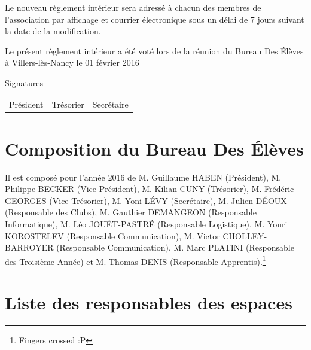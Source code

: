 \documentclass{article} %
\begin{document}
		Le nouveau règlement intérieur sera adressé à chacun des membres de
		l'association par affichage et courrier électronique sous un délai de 7
		jours suivant la date de la modification.


	\begin{center}
		{\large\light Le présent règlement intérieur a été voté lors de la réunion
		du Bureau Des Élèves à Villers-lès-Nancy le 01 février 2016}
	\end{center}
	Signatures\par
	\vspace{0.5cm}
	\begin{tabular*}{\textwidth}{@{\extracolsep{\fill}}ccc}
		Président & Trésorier & Secrétaire
	\end{tabular*}
	\vspace{3cm}
	\clearpage

	\section*{Composition du Bureau Des Élèves}
		
		Il est composé pour l’année 2016 de M. Guillaume HABEN (Président), M.
		Philippe BECKER (Vice-Président), M. Kilian CUNY (Trésorier), M.
		Frédéric GEORGES (Vice-Trésorier), M. Yoni LÉVY (Secrétaire), M. Julien
		DÉOUX (Responsable des Clubs), M. Gauthier DEMANGEON (Responsable
		Informatique), M. Léo JOUËT-PASTRÉ (Responsable Logistique), M. Youri
		KOROSTELEV (Responsable Communication), M. Victor CHOLLEY-BARROYER
		(Responsable Communication), M. Marc PLATINI (Responsable des Troisième
		Année) et M. Thomas DENIS (Responsable Apprentis).\footnote{Fingers
		crossed :P}

	\section*{Liste des responsables des espaces}
\end{document}
